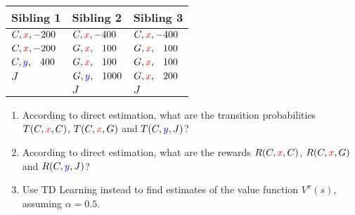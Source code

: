 \documentclass[12pt]{article}
\begin{document}
\begin{enumerate}
\begin{center}
\begin{tabular}{|l|l|l|} \hline
{\bf Sibling 1} & {\bf Sibling 2} & {\bf Sibling 3} \\ \hline
$C, {\color{red}{x}}, -200$ & $C, {\color{red}{x}}, -400$ & $C, {\color{red}{x}}, -400$ \\
$C, {\color{red}{x}}, -200$ & $G, {\color{red}{x}},  \phantom{-}100$ & $G, {\color{red}{x}},  \phantom{-}100$ \\
$C, {\color{blue}{y}}, \phantom{-}400$ & $G, {\color{red}{x}},  \phantom{-}100$ & $G, {\color{red}{x}},  \phantom{-}100$ \\
$J$          & $G, {\color{blue}{y}}, \phantom{-}1000$ & $G, {\color{red}{x}},  \phantom{-}200$ \\
             & $J$          & $J$          \\ \hline
\end{tabular}
\end{center}

  \begin{enumerate}

  \item According to direct estimation, what are the transition
    probabilities $T(C,{\color{red}{x}},C)$, $T(C,{\color{red}{x}},G)$ and $T(C,{\color{blue}{y}},J)$?

  \item According to direct estimation, what are the rewards
    $R(C,{\color{red}{x}},C)$, $R(C,{\color{red}{x}},G)$ and $R(C,{\color{blue}{y}},J)$?

  \item Use TD Learning instead to find estimates of the value
    function $V^{\pi}(s)$, assuming $\alpha=0.5$.

  \end{enumerate}

\end{enumerate}
\end{document}
